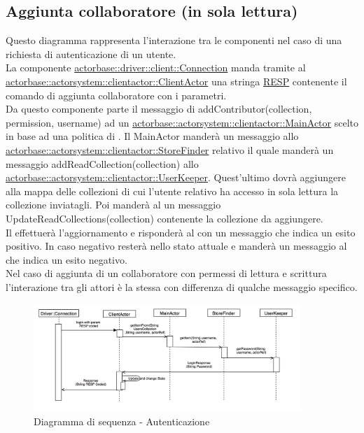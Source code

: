 \documentclass{scalatekids-article}
\begin{document}
\subsection{Aggiunta collaboratore (in sola lettura)}

Questo diagramma rappresenta l'interazione tra le componenti nel caso di una richiesta di autenticazione di un utente.\\
La componente \hyperref[sec:actorbase::driver::client::Connection]{actorbase::driver::client::Connection}
manda tramite  al \hyperref[sec:actorbase::actorsystem::clientactor::ClientActor]{actorbase::actorsystem::clientactor::ClientActor}
una stringa \hyperref[sec:RESP]{RESP} contenente il comando di aggiunta collaboratore  con
i parametri.\\
Da questo componente parte il messaggio di addContributor(collection, permission, username) ad un \hyperref[sec:actorbase::actorsystem::clientactor::MainActor]{actorbase::actorsystem::clientactor::MainActor} scelto in base ad una
politica di . Il MainActor manderà un messaggio allo
\hyperref[sec:actorbase::actorsystem::clientactor::StoreFinder]{actorbase::actorsystem::clientactor::StoreFinder}
relativo il quale manderà un messaggio addReadCollection(collection) allo
\hyperref[sec:actorbase::actorsystem::clientactor::UserKeeper]{actorbase::actorsystem::clientactor::UserKeeper}.
Quest'ultimo dovrà aggiungere alla mappa delle collezioni di cui l'utente
relativo ha accesso in sola lettura la collezione inviatagli.
Poi manderà al  un messaggio UpdateReadCollections(collection)
contenente la collezione da aggiungere.\\
Il  effettuerà l'aggiornamento e risponderà al 
con un messaggio che indica un esito positivo. In caso negativo resterà nello
stato attuale e manderà un messaggio al  che indica un esito
negativo.\\
Nel caso di aggiunta di un collaboratore con permessi di lettura e scrittura
l'interazione tra gli attori è la stessa con differenza di qualche messaggio
specifico.\\
\begin{figure}[H]
  \begin{center}
    \includegraphics[width=0.9\textwidth, keepaspectratio]{img/diagrammiSequenza/esempioAuth.png}
    \caption{Diagramma di sequenza - Autenticazione}
  \end{center}
\end{figure}
\end{document}

